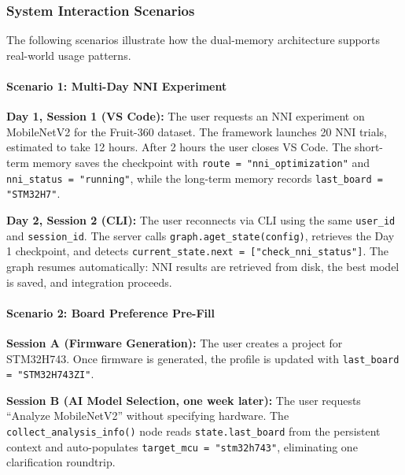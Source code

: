 \subsubsection{System Interaction Scenarios}

The following scenarios illustrate how the dual-memory architecture supports real-world usage patterns.

\paragraph{Scenario 1: Multi-Day NNI Experiment}

\textbf{Day 1, Session 1 (VS Code):}\newline
The user requests an NNI experiment on MobileNetV2 for the Fruit-360 dataset. The framework launches 20 NNI trials, estimated to take 12 hours. After 2 hours the user closes VS Code. The short-term memory saves the checkpoint with \texttt{route = "nni\_optimization"} and \texttt{nni\_status = "running"}, while the long-term memory records \texttt{last\_board = "STM32H7"}.

\textbf{Day 2, Session 2 (CLI):}\newline
The user reconnects via CLI using the same \texttt{user\_id} and \texttt{session\_id}. The server calls \texttt{graph.aget\_state(config)}, retrieves the Day 1 checkpoint, and detects \texttt{current\_\allowbreak state.next = ["check\_\allowbreak nni\_\allowbreak status"]}. The graph resumes automatically: NNI results are retrieved from disk, the best model is saved, and integration proceeds.

\paragraph{Scenario 2: Board Preference Pre-Fill}

\textbf{Session A (Firmware Generation):}\newline
The user creates a project for STM32H743. Once firmware is generated, the profile is updated with \texttt{last\_board = "STM32H743ZI"}.

\textbf{Session B (AI Model Selection, one week later):}\newline
The user requests ``Analyze MobileNetV2'' without specifying hardware. The \texttt{collect\_\allowbreak analysis\_\allowbreak info()} node reads \texttt{state.last\_board} from the persistent context and auto-populates \texttt{target\_mcu = "stm32h743"}, eliminating one clarification roundtrip.

